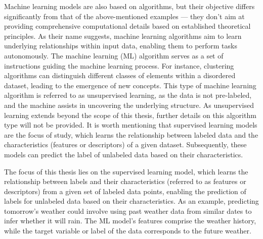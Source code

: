 \documentclass[main]{subfiles}
\begin{document}
Machine learning models are also based on algorithms, but their objective differs significantly from that of the above-mentioned examples --- they don't aim at providing comprehensive computational details based on established theoretical principles. As their name suggests, machine learning algorithms aim to learn underlying relationships within input data, enabling them to perform tasks autonomously. The machine learning (ML) algorithm serves as a set of instructions guiding the machine learning process. For instance, clustering algorithms can distinguish different classes of elements within a disordered dataset, leading to the emergence of new concepts. This type of machine learning algorithm is referred to as unsupervised learning, as the data is not pre-labeled, and the machine assists in uncovering the underlying structure. As unsupervised learning extends beyond the scope of this thesis, further details on this algorithm type will not be provided.  It is worth mentioning that supervised learning models are the focus of study, which learns the relationship between labeled data and the characteristics (features or descriptors) of a given dataset. Subsequently, these models can predict the label of unlabeled data based on their characteristics.

The focus of this thesis lies on the supervised learning model, which learns the relationship between labels and their characteristics (referred to as features or descriptors) from a given set of labeled data points, enabling the prediction of labels for unlabeled data based on their characteristics. As an example, predicting tomorrow's weather could involve using past weather data from similar dates to infer whether it will rain. The ML model's features comprise the weather history, while the target variable or label of the data corresponds to the future weather.
\end{document}
